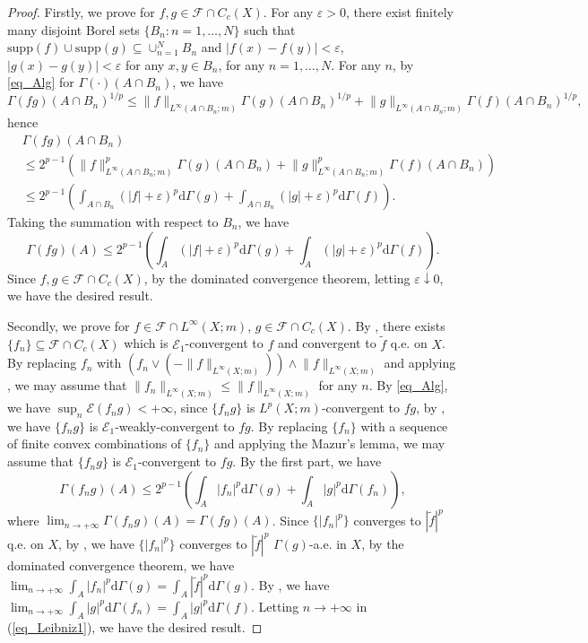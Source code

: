 \documentclass[11pt,a4paper]{article}
\numberwithin{equation}{section}
\theoremstyle{plain}
\theoremstyle{definition}
\begin{document}
\begin{proof}
Firstly, we prove for $f,g\in\mathcal{F}\cap C_c(X)$. For any $\varepsilon>0$, there exist finitely many disjoint Borel sets $\{B_n:n=1,\ldots,N\}$ such that $\mathrm{supp}(f)\cup\mathrm{supp}(g)\subseteq\cup_{n=1}^NB_n$ and $|f(x)-f(y)|<\varepsilon$, $|g(x)-g(y)|<\varepsilon$ for any $x,y\in B_n$, for any $n=1,\ldots,N$. For any $n$, by \ref{eq_Alg} for $\Gamma(\cdot)(A\cap B_n)$, we have
$$\Gamma(fg)(A\cap B_n)^{1/p}\le \lVert {f}\rVert_{L^\infty(A\cap B_n;m)}\Gamma(g)(A\cap B_n)^{1/p}+\lVert {g}\rVert_{L^\infty(A\cap B_n;m)}\Gamma(f)(A\cap B_n)^{1/p},$$
hence
\begin{align*}
&\Gamma(fg)(A\cap B_n)\\
&\le2^{p-1}\left(\lVert {f}\rVert_{L^\infty(A\cap B_n;m)}^p\Gamma(g)(A\cap B_n)+\lVert {g}\rVert_{L^\infty(A\cap B_n;m)}^p\Gamma(f)(A\cap B_n)\right)\\
&\le2^{p-1}\left(\int_{A\cap B_n}(|f|+\varepsilon)^p\mathrm{d}\Gamma(g)+\int_{A\cap B_n}(|g|+\varepsilon)^p\mathrm{d}\Gamma(f)\right).
\end{align*}
Taking the summation with respect to $B_n$, we have
$$\Gamma(fg)(A)\le2^{p-1}\left(\int_{A}(|f|+\varepsilon)^p\mathrm{d}\Gamma(g)+\int_{A}(|g|+\varepsilon)^p\mathrm{d}\Gamma(f)\right).$$
Since $f,g\in\mathcal{F}\cap C_c(X)$, by the dominated convergence theorem, letting $\varepsilon\downarrow0$, we have the desired result.

Secondly, we prove for $f\in\mathcal{F}\cap L^\infty(X;m)$, $g\in\mathcal{F}\cap C_c(X)$. By \cite[Proposition 8.5]{Yan25a}, there exists $\{f_n\}\subseteq\mathcal{F}\cap C_c(X)$ which is $\mathcal{E}_1$-convergent to $f$ and convergent to $\widetilde{f}$ q.e. on $X$. By replacing $f_n$ with $(f_n\vee(-\lVert {f}\rVert_{L^\infty(X;m)}))\wedge \lVert {f}\rVert_{L^\infty(X;m)}$ and applying \cite[Corollary 3.19 (b)]{KS24a}, we may assume that $\lVert {f_n}\rVert_{L^\infty(X;m)}\le \lVert {f}\rVert_{L^\infty(X;m)}$ for any $n$. By \ref{eq_Alg}, we have $\sup_n\mathcal{E}(f_ng)<+\infty$, since $\{f_ng\}$ is $L^p(X;m)$-convergent to $fg$, by \cite[Lemma 3.17]{KS24a}, we have $\{f_ng\}$ is $\mathcal{E}_1$-weakly-convergent to $fg$. By replacing $\{f_n\}$ with a sequence of finite convex combinations of $\{f_n\}$ and applying the Mazur's lemma, we may assume that $\{f_ng\}$ is $\mathcal{E}_1$-convergent to $fg$. By the first part, we have
\begin{equation}\label{eq_Leibniz1}
\Gamma(f_ng)(A)\le2^{p-1}\left(\int_A|f_n|^p\mathrm{d}\Gamma(g)+\int_A|g|^p\mathrm{d}\Gamma(f_n)\right),
\end{equation}
where $\lim_{n\to+\infty}\Gamma(f_ng)(A)=\Gamma(fg)(A)$. Since $\{|f_n|^p\}$ converges to $|\widetilde{f}|^p$ q.e. on $X$, by \cite[Proposition 8.12]{Yan25a}, we have $\{|f_n|^p\}$ converges to $|\widetilde{f}|^p$ $\Gamma(g)$-a.e. in $X$, by the dominated convergence theorem, we have $\lim_{n\to+\infty}\int_A|f_n|^p\mathrm{d}\Gamma(g)=\int_A|\widetilde{f}|^p\mathrm{d}\Gamma(g)$. By \cite[Proposition 4.9]{KS24a}, we have $\lim_{n\to+\infty}\int_A|g|^p\mathrm{d}\Gamma(f_n)=\int_A|g|^p\mathrm{d}\Gamma(f)$. Letting $n\to+\infty$ in (\ref{eq_Leibniz1}), we have the desired result.


\end{proof}
\end{document}
